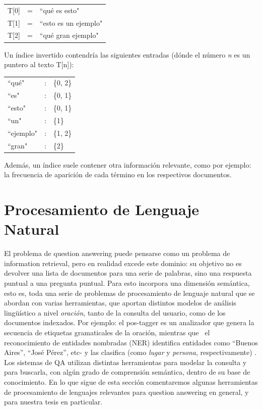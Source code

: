 \begin{tabular}{lll}
T[0] & = & ``qué es esto" \\
T[1] & = & ``esto es un ejemplo" \\
T[2] & = & ``qué gran ejemplo" \\
\end{tabular}

\medskip
Un índice invertido contendría las siguientes entradas (dónde el número \textit{n} es un puntero al texto T[n]):
\medskip

\begin{tabular}{lll}
	``qué" & : & \{0, 2\}\\
	``es" &:& \{0, 1\}\\
	``esto" & :& \{0, 1\} \\
	``un" & :&   \{1\} \\
	``ejemplo" & :& \{1, 2\} \\
	``gran" & :& \{2\} \\
\end{tabular}

\medskip

Además, un índice suele contener otra información relevante, como por ejemplo: la frecuencia de aparición de cada término en los respectivos documentos.


\section{Procesamiento de Lenguaje Natural}
\label{sec:nlp}

El problema de question answering puede pensarse como un problema de information
retrieval, pero en realidad excede este dominio: su objetivo no es devolver una lista de documentos para
una serie de palabras, sino una respuesta puntual a una pregunta
puntual. Para esto incorpora una dimensión semántica, esto es, toda
una serie de problemas de procesamiento de lenguaje natural que se
abordan con varias herramientas, que aportan distintos modelos de
análisis lingüístico a nivel \textit{oración}, tanto de la
consulta del usuario, como de los documentos indexados. Por ejemplo: el
pos-tagger es un analizador que genera la secuencia de etiquetas gramaticales de la
oración, mientras que \ el reconocimiento de entidades nombradas
(NER) identifica entidades como {\textquotedblleft}Buenos
Aires{\textquotedblright}, {\textquotedblleft}José
Pérez{\textquotedblright}, etc- y las clasifica (como \textit{lugar}
y \textit{persona}, respectivamente) . Los sistemas de QA utilizan
distintas herramientas para modelar la consulta y para buscarla, con
algún grado de comprensión semántica, dentro de su base de
conocimiento.
En lo que sigue de esta sección comentaremos algunas herramientas de procesamiento de lenguajes relevantes para question answering en general, y para nuestra tesis en particular.

